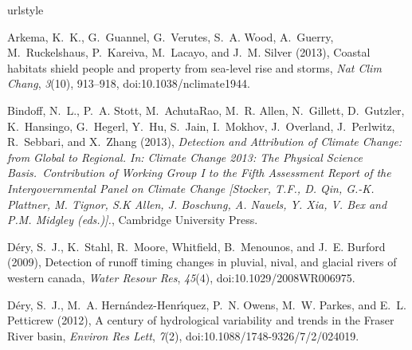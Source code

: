 \documentclass{AGUJournal}
\begin{document}


%

\begin{thebibliography}{38}
\providecommand{\natexlab}[1]{#1}
\expandafter\ifx\csname urlstyle\endcsname\relax
  \providecommand{\doi}[1]{doi:\discretionary{}{}{}#1}\else
  \providecommand{\doi}{doi:\discretionary{}{}{}\begingroup
  \urlstyle{rm}\Url}\fi

Arkema, K.~K., G.~Guannel, G.~Verutes, S.~A. Wood, A.~Guerry, M.~Ruckelshaus,
  P.~Kareiva, M.~Lacayo, and J.~M. Silver (2013), Coastal habitats shield
  people and property from sea-level rise and storms, \textit{Nat Clim Chang},
  \textit{3}(10), 913--918, \doi{10.1038/nclimate1944}.

Bindoff, N.~L., P.~A. Stott, M.~{AchutaRao}, M.~R. Allen, N.~Gillett,
  D.~Gutzler, K.~Hansingo, G.~Hegerl, Y.~Hu, S.~Jain, I.~Mokhov, J.~Overland,
  J.~Perlwitz, R.~Sebbari, and X.~Zhang (2013), \textit{{Detection and
  Attribution of Climate Change: from Global to Regional}. In: {Climate Change
  2013}: The Physical Science Basis.~Contribution of Working Group I to the
  Fifth Assessment Report of the {Intergovernmental Panel on Climate Change}
  {[Stocker, T.F., D. Qin, G.-K. Plattner, M. Tignor, S.K Allen, J. Boschung,
  A. Nauels, Y. Xia, V. Bex and P.M. Midgley (eds.)].}}, Cambridge University
  Press.

D{\'e}ry, S.~J., K.~Stahl, R.~Moore, Whitfield, B.~Menounos, and J.~E. Burford
  (2009), Detection of runoff timing changes in pluvial, nival, and glacial
		rivers of western canada, \textit{Water Resour Res}, \textit{45}(4),
  \doi{10.1029/2008WR006975}.

D{\'e}ry, S.~J., M.~A. {Hern{\'a}ndez-Henr{\'\i}quez}, P.~N. Owens, M.~W.
  Parkes, and E.~L. Petticrew (2012), A century of hydrological variability and
  trends in the {Fraser River} basin, \textit{Environ Res Lett}, \textit{7}(2),
  \doi{10.1088/1748-9326/7/2/024019}.


\end{thebibliography}
\end{document}
